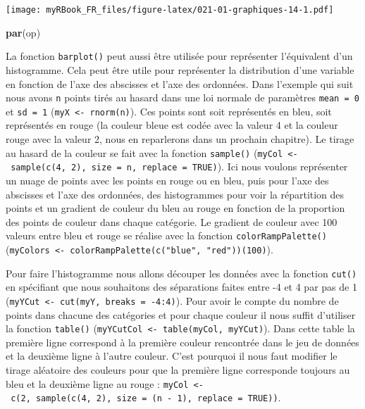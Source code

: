 \documentclass[]{book}
\newenvironment{Shaded}{\begin{snugshade}}{\end{snugshade}}
\newcommand{\KeywordTok}[1]{\textcolor[rgb]{0.13,0.29,0.53}{\textbf{#1}}}
\newcommand{\NormalTok}[1]{#1}
\begin{document}
\texttt{[image: myRBook\_FR\_files/figure-latex/021-01-graphiques-14-1.pdf]}

\begin{Shaded}
\begin{Highlighting}[]
\KeywordTok{par}\NormalTok{(op)}
\end{Highlighting}
\end{Shaded}

La fonction \texttt{barplot()} peut aussi être utilisée pour représenter l'équivalent d'un histogramme. Cela peut être utile pour représenter la distribution d'une variable en fonction de l'axe des abscisses et l'axe des ordonnées. Dans l'exemple qui suit nous avons \texttt{n} points tirés au hasard dans une loi normale de paramètres \texttt{mean\ =\ 0} et \texttt{sd\ =\ 1} (\texttt{myX\ \textless{}-\ rnorm(n)}). Ces points sont soit représentés en bleu, soit représentés en rouge (la couleur bleue est codée avec la valeur 4 et la couleur rouge avec la valeur 2, nous en reparlerons dans un prochain chapitre). Le tirage au hasard de la couleur se fait avec la fonction \texttt{sample()} (\texttt{myCol\ \textless{}-\ sample(c(4,\ 2),\ size\ =\ n,\ replace\ =\ TRUE)}). Ici nous voulons représenter un nuage de points avec les points en rouge ou en bleu, puis pour l'axe des abscisses et l'axe des ordonnées, des histogrammes pour voir la répartition des points et un gradient de couleur du bleu au rouge en fonction de la proportion des points de couleur dans chaque catégorie. Le gradient de couleur avec 100 valeurs entre bleu et rouge se réalise avec la fonction \texttt{colorRampPalette()} (\texttt{myColors\ \textless{}-\ colorRampPalette(c("blue",\ "red"))(100)}).

Pour faire l'histogramme nous allons découper les données avec la fonction \texttt{cut()} en spécifiant que nous souhaitons des séparations faites entre -4 et 4 par pas de 1 (\texttt{myYCut\ \textless{}-\ cut(myY,\ breaks\ =\ -4:4)}). Pour avoir le compte du nombre de points dans chacune des catégories et pour chaque couleur il nous suffit d'utiliser la fonction \texttt{table()} (\texttt{myYCutCol\ \textless{}-\ table(myCol,\ myYCut)}). Dans cette table la première ligne correspond à la première couleur rencontrée dans le jeu de données et la deuxième ligne à l'autre couleur. C'est pourquoi il nous faut modifier le tirage aléatoire des couleurs pour que la première ligne corresponde toujours au bleu et la deuxième ligne au rouge : \texttt{myCol\ \textless{}-\ c(2,\ sample(c(4,\ 2),\ size\ =\ (n\ -\ 1),\ replace\ =\ TRUE))}.
\end{document}
